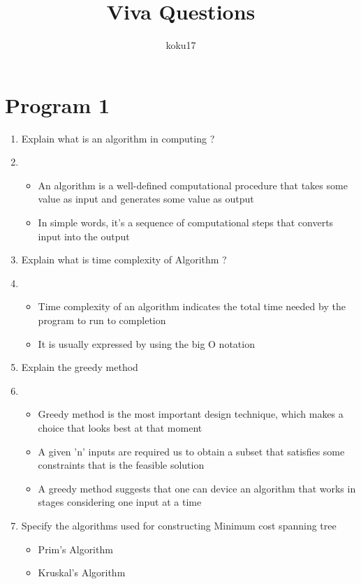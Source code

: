 ﻿\documentclass{article}
\author{koku17}
\date{}
\title{Viva Questions}
\newcommand{\answer}{\item [$\rightarrow$]}
\begin{document}
	\maketitle \newpage
	\begingroup \color{white} \tableofcontents \endgroup \newpage

	\section*{Program 1}  
	\begin{enumerate}[label=\arabic*. ]
		\item Explain what is an algorithm in computing ?
		\answer
			\begin{itemize}[label=$\ast$]
				\item An algorithm is a well-defined computational procedure that takes some value as
					input and generates some value as output
				\item In simple words, it's a sequence of computational steps that converts input into
					the output
			\end{itemize}

		\item Explain what is time complexity of Algorithm ?
		\answer
			\begin{itemize}[label=$\ast$]
				\item Time complexity of an algorithm indicates the total time needed by the program to
					run to completion
				\item It is usually expressed by using the big O notation
			\end{itemize}

		\item Explain the greedy method
		\answer
			\begin{itemize}[label=$\ast$]
				\item Greedy method is the most important design technique, which makes a choice that
					looks best at that moment
				\item A given 'n' inputs are required us to obtain a subset that satisfies some
					constraints that is the feasible solution
				\item A greedy method suggests that one can device an algorithm that works in stages
					considering one input at a time
			\end{itemize}

		\item Specify the algorithms used for constructing Minimum cost spanning tree
			\begin{itemize}[label=$\ast$]
				\item Prim's Algorithm
				\item Kruskal's Algorithm
			\end{itemize}


\end{enumerate}
\end{document}
